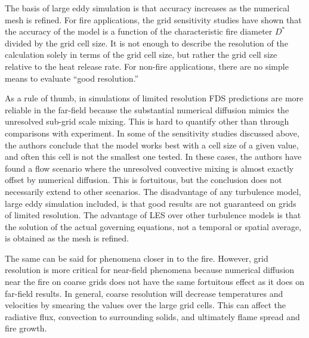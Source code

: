 \documentclass[11pt]{book}
\begin{document}
The basis of  large eddy simulation is that  accuracy increases as the
numerical mesh is refined. For fire applications, the grid sensitivity
studies have shown that the accuracy of the model is a function of the
characteristic fire diameter  $D^*$ divided by the grid  cell size. It
is not enough to describe  the resolution of the calculation solely in
terms of the grid cell size, but rather the grid cell size relative to
the heat release rate.  For non-fire applications, there are no simple
means to evaluate ``good resolution.''

As  a  rule  of  thumb,  in  simulations  of  limited  resolution  FDS
predictions are more reliable in the far-field because the substantial
numerical diffusion mimics the  unresolved sub-grid scale mixing. This
is hard to quantify other than through comparisons with experiment. In
some of the sensitivity  studies discussed above, the authors conclude
that the model works best with a cell size of a given value, and often
this cell is not the smallest  one tested. In these cases, the authors
have found a  flow scenario where the unresolved  convective mixing is
almost exactly offset by  numerical diffusion. This is fortuitous, but
the  conclusion does not  necessarily extend  to other  scenarios. The
disadvantage of any turbulence  model, large eddy simulation included,
is  that  good  results  are   not  guaranteed  on  grids  of  limited
resolution. The advantage of LES  over other turbulence models is that
the  solution of  the actual  governing equations,  not a  temporal or
spatial average, is obtained as the mesh is refined.

The same  can be said  for phenomena closer  in to the  fire. However,
grid  resolution is  more  critical for  near-field phenomena  because
numerical diffusion  near the fire on  coarse grids does  not have the
same fortuitous  effect as it  does on far-field results.  In general,
coarse  resolution  will   decrease  temperatures  and  velocities  by
smearing the  values over  the large grid  cells. This can  affect the
radiative flux, convection to surrounding solids, and ultimately flame
spread and fire growth.








\backmatter




\end{document}

